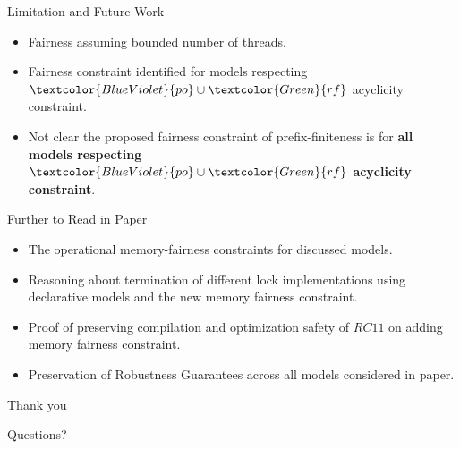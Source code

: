 \documentclass[dvipsnames, notes]{beamer}
\newcommand{\po}{\textcolor{BlueViolet}{po}}
\newcommand{\rf}{\textcolor{Green}{rf}}
\begin{document}
    \begin{frame}{Limitation and Future Work}

      \begin{itemize}
        \item Fairness assuming bounded number of threads.
        \item Fairness constraint identified for models respecting $\po \cup \rf$ acyclicity constraint.
        \item Not clear the proposed fairness constraint of prefix-finiteness is for \textbf{all models respecting $\po \cup \rf$ acyclicity constraint}. 
      \end{itemize}
      
    \end{frame}

    \begin{frame}{Further to Read in Paper}

      \begin{itemize}
        \item The operational memory-fairness constraints for discussed models.
        \item Reasoning about termination of different lock implementations using declarative models and the new memory fairness constraint.
        \item Proof of preserving compilation and optimization safety of $RC11$ on adding memory fairness constraint.
        \item Preservation of Robustness Guarantees across all models considered in paper.
      \end{itemize}
      
    \end{frame}

    \begin{frame}{Thank you}

      Questions?
      
    \end{frame}


  
\end{document}
